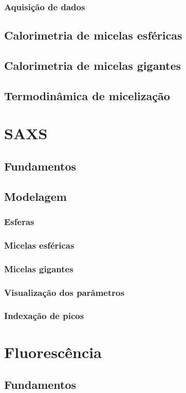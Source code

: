 			\subsection{Aquisição de dados}
		\section{Calorimetria de micelas esféricas}
		\section{Calorimetria de micelas gigantes}
		\section{Termodinâmica de micelização}
	\chapter{SAXS}
		\section{Fundamentos}
		\section{Modelagem}
			\subsection{Esferas}
			\subsection{Micelas esféricas}
			\subsection{Micelas gigantes}
			\subsection{Visualização dos parâmetros}
			\subsection{Indexação de picos}
	\chapter{Fluorescência}
		\section{Fundamentos}
